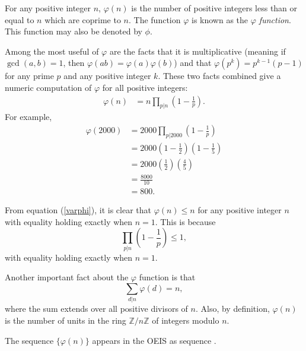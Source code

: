 \documentclass[12pt]{article}
\begin{document}
For any positive integer $n$, $\varphi(n)$ is the number of positive integers less than or equal to $n$ which are coprime to $n$.  The function $\varphi$ is known as the \emph{ $\varphi$ function}.  This function may also be denoted by $\phi$.

Among the most useful  of $\varphi$ are the facts that it is multiplicative (meaning if $\gcd(a,b)=1$, then $\varphi(ab)=\varphi(a)\varphi(b)$) and that $\varphi(p^k)=p^{k-1}(p-1)$ for any prime $p$ and any positive integer $k$. These two facts combined give a numeric computation of $\varphi$ for all positive integers:
\begin{align}
\label{varphi}
\varphi(n) & =n \prod_{p|n} \left( 1-\frac{1}{p} \right).
\end{align}
For example, 
\begin{align*}
\varphi (2000) & = 2000 \prod_{p|2000} \left(1-\frac{1}{p} \right) \\
& = 2000 \left( 1 - \frac{1}{2} \right) \left( 1 - \frac{1}{5} \right) \\
& = 2000 \left( \frac{1}{2} \right) \left( \frac{4}{5} \right) \\
& = \frac{8000}{10} \\
& = 800.
\end{align*}

From equation (\ref{varphi}), it is clear that $\varphi(n)\le n$ for any positive integer $n$ with equality holding exactly when $n=1$.  This is because
\[
\prod_{p|n} \left( 1-\frac{1}{p} \right) \le 1,
\]
with equality holding exactly when $n=1$.

Another important fact about the  $\varphi$ function is that
\[
\sum_{d|n} \varphi(d)=n,
\]
where the sum extends over all positive divisors of $n$.  Also, by definition, $\varphi(n)$ is the number of units in the ring $\mathbb{Z}/n\mathbb{Z}$ of integers modulo $n$.

The sequence $\{\varphi(n)\}$ appears in the OEIS as sequence .
\end{document}
